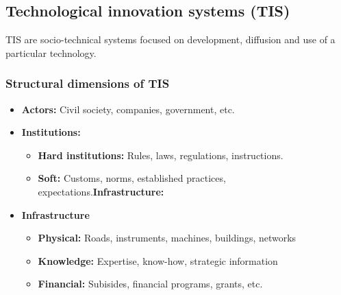 \documentclass[12pt,a4paper]{article}
\begin{document}
\subsection{Technological innovation systems (TIS)}
TIS are socio-technical systems focused on development, diffusion and use of a particular technology.
\subsubsection{Structural dimensions of TIS}
\begin{itemize}
    \item \textbf{Actors:} Civil society, companies, government, etc.
    \item \textbf{Institutions:}
    \begin{itemize}
        \item \textbf{Hard institutions:} Rules, laws, regulations, instructions.
        \item \textbf{Soft:} Customs, norms, established practices, expectations.\textbf{Infrastructure:} 
    \end{itemize}
    \item \textbf{Infrastructure}
    \begin{itemize}
        \item \textbf{Physical:} Roads, instruments, machines, buildings, networks
        \item \textbf{Knowledge:} Expertise, know-how, strategic information
        \item \textbf{Financial:} Subisides, financial programs, grants, etc. 
    \end{itemize}
\end{itemize} 
\end{document}
